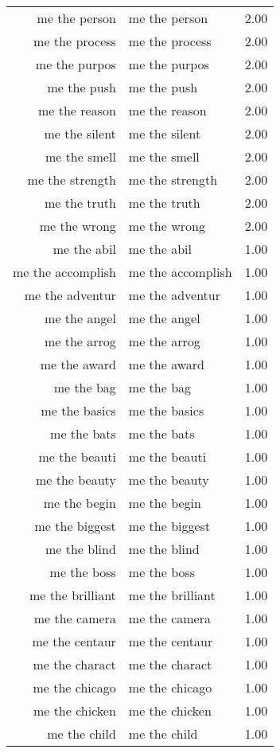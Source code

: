 \begin{table}[ht]
\begin{tabular}{rlr}
  me the person & me the person & 2.00 \\ 
  me the process & me the process & 2.00 \\ 
  me the purpos & me the purpos & 2.00 \\ 
  me the push & me the push & 2.00 \\ 
  me the reason & me the reason & 2.00 \\ 
  me the silent & me the silent & 2.00 \\ 
  me the smell & me the smell & 2.00 \\ 
  me the strength & me the strength & 2.00 \\ 
  me the truth & me the truth & 2.00 \\ 
  me the wrong & me the wrong & 2.00 \\ 
  me the abil & me the abil & 1.00 \\ 
  me the accomplish & me the accomplish & 1.00 \\ 
  me the adventur & me the adventur & 1.00 \\ 
  me the angel & me the angel & 1.00 \\ 
  me the arrog & me the arrog & 1.00 \\ 
  me the award & me the award & 1.00 \\ 
  me the bag & me the bag & 1.00 \\ 
  me the basics & me the basics & 1.00 \\ 
  me the bats & me the bats & 1.00 \\ 
  me the beauti & me the beauti & 1.00 \\ 
  me the beauty & me the beauty & 1.00 \\ 
  me the begin & me the begin & 1.00 \\ 
  me the biggest & me the biggest & 1.00 \\ 
  me the blind & me the blind & 1.00 \\ 
  me the boss & me the boss & 1.00 \\ 
  me the brilliant & me the brilliant & 1.00 \\ 
  me the camera & me the camera & 1.00 \\ 
  me the centaur & me the centaur & 1.00 \\ 
  me the charact & me the charact & 1.00 \\ 
  me the chicago & me the chicago & 1.00 \\ 
  me the chicken & me the chicken & 1.00 \\ 
  me the child & me the child & 1.00 \\ 

\end{tabular}
\end{table}
